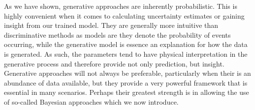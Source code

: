 As we have shown, generative approaches are inherently probabilistic.  This is highly convenient
when it comes to calculating uncertainty estimates or gaining insight from our trained model.
They are generally more intuitive than discriminative methods as models are they denote the probability
of events occurring, while the generative model is essence an explanation for how the data is
generated.  As such, the parameters tend to have physical interpretation in the generative process and
therefore provide not only prediction, but insight.  Generative approaches will not always be preferable,
particularly when their is an abundance of data available, but they provide a very powerful framework
that is essential in many scenarios.  Perhaps their greatest strength is in allowing the use of so-called
Bayesian approaches which we now introduce.